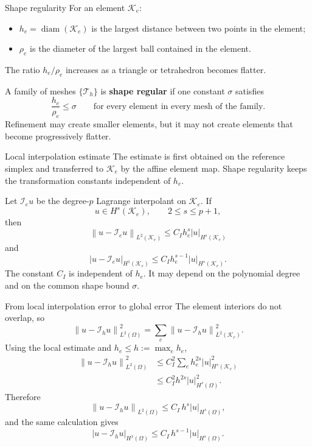 \documentclass[11pt,aspectratio=169]{beamer}
\newcommand{\Om}{\Omega}
\newcommand{\Th}{\mathcal T_h}
\newcommand{\Ih}{\mathcal I_h}
\newcommand{\Ie}{\mathcal I_e}
\newcommand{\norm}[2][]{\left\lVert#2\right\rVert_{#1}}
\newcommand{\seminorm}[2][]{\left\lvert#2\right\rvert_{#1}}
\begin{document}
\begin{frame}{Shape regularity}
For an element $\mathcal K_e$:
\begin{itemize}
  \item $h_e=\operatorname{diam}(\mathcal K_e)$ is the largest distance
  between two points in the element;
  \item $\rho_e$ is the diameter of the largest ball contained in the element.
\end{itemize}
The ratio $h_e/\rho_e$ increases as a triangle or tetrahedron becomes flatter.

\vspace{0.25cm}
A family of meshes $\{\Th\}$ is \textbf{shape regular} if one constant
$\sigma$ satisfies
\[
  \boxed{\frac{h_e}{\rho_e}\leq\sigma}
  \qquad\text{for every element in every mesh of the family.}
\]
Refinement may create smaller elements, but it may not create elements that become
progressively flatter.
\end{frame}

\begin{frame}{Local interpolation estimate}
The estimate is first obtained on the reference simplex and transferred to
$\mathcal K_e$ by the affine element map. Shape regularity keeps the
transformation constants independent of $h_e$.

Let $\Ie u$ be the degree-$p$ Lagrange interpolant on $\mathcal K_e$. If
\[
  u\in H^s(\mathcal K_e),
  \qquad 2\leq s\leq p+1,
\]
then
\[
  \boxed{\norm[L^2(\mathcal K_e)]{u-\Ie u}
  \leq C_I h_e^s\seminorm[H^s(\mathcal K_e)]{u}}
\]
and
\[
  \boxed{\seminorm[H^1(\mathcal K_e)]{u-\Ie u}
  \leq C_I h_e^{s-1}\seminorm[H^s(\mathcal K_e)]{u}.}
\]
The constant $C_I$ is independent of $h_e$. It may depend on the polynomial
degree and on the common shape bound $\sigma$.
\end{frame}

\begin{frame}{From local interpolation error to global error}
The element interiors do not overlap, so
\[
  \norm[L^2(\Om)]{u-\Ih u}^2
  =\sum_e\norm[L^2(\mathcal K_e)]{u-\Ih u}^2.
\]
Using the local estimate and $h_e\leq h:=\max_eh_e$,
\begin{align*}
  \norm[L^2(\Om)]{u-\Ih u}^2
  &\leq C_I^2\sum_e h_e^{2s}\seminorm[H^s(\mathcal K_e)]{u}^2\\
  &\leq C_I^2h^{2s}\seminorm[H^s(\Om)]{u}^2.
\end{align*}
Therefore
\[
  \norm[L^2(\Om)]{u-\Ih u}\leq C_I\,h^s\seminorm[H^s(\Om)]{u},
\]
and the same calculation gives
\[
  \seminorm[H^1(\Om)]{u-\Ih u}
  \leq C_I\,h^{s-1}\seminorm[H^s(\Om)]{u}.
\]
\end{frame}
\end{document}
